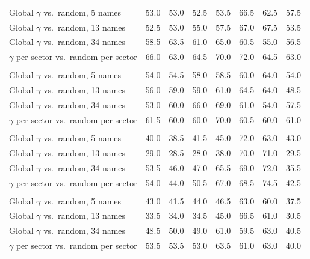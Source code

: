 \begin{table}[H]
\begin{tabular}{l*{7}{r}}
Global $\gamma$ vs.\ random, 5 names & 53.0 & 53.0 & 52.5 & 53.5 & 66.5 & 62.5 & 57.5 \\
Global $\gamma$ vs.\ random, 13 names & 52.5 & 53.0 & 55.0 & 57.5 & 67.0 & 67.5 & 53.5 \\
Global $\gamma$ vs.\ random, 34 names & 58.5 & 63.5 & 61.0 & 65.0 & 60.5 & 55.0 & 56.5 \\
$\gamma$ per sector vs.\ random per sector & 66.0 & 63.0 & 64.5 & 70.0 & 72.0 & 64.5 & 63.0 \\
\addlinespace
\multicolumn{8}{l}{\emph{Burst stress (200), hedge on}} \\
Global $\gamma$ vs.\ random, 5 names & 54.0 & 54.5 & 58.0 & 58.5 & 60.0 & 64.0 & 54.0 \\
Global $\gamma$ vs.\ random, 13 names & 56.0 & 59.0 & 59.0 & 61.0 & 64.5 & 64.0 & 48.5 \\
Global $\gamma$ vs.\ random, 34 names & 53.0 & 60.0 & 66.0 & 69.0 & 61.0 & 54.0 & 57.5 \\
$\gamma$ per sector vs.\ random per sector & 61.5 & 60.0 & 60.0 & 70.0 & 60.5 & 60.0 & 61.0 \\
\addlinespace
\multicolumn{8}{l}{\emph{Bear stress (200), hedge off}} \\
Global $\gamma$ vs.\ random, 5 names & 40.0 & 38.5 & 41.5 & 45.0 & 72.0 & 63.0 & 43.0 \\
Global $\gamma$ vs.\ random, 13 names & 29.0 & 28.5 & 28.0 & 38.0 & 70.0 & 71.0 & 29.5 \\
Global $\gamma$ vs.\ random, 34 names & 53.5 & 46.0 & 47.0 & 65.5 & 69.0 & 72.0 & 35.5 \\
$\gamma$ per sector vs.\ random per sector & 54.0 & 44.0 & 50.5 & 67.0 & 68.5 & 74.5 & 42.5 \\
\addlinespace
\multicolumn{8}{l}{\emph{Bear stress (200), hedge on}} \\
Global $\gamma$ vs.\ random, 5 names & 43.0 & 41.5 & 44.0 & 46.5 & 63.0 & 60.0 & 37.5 \\
Global $\gamma$ vs.\ random, 13 names & 33.5 & 34.0 & 34.5 & 45.0 & 66.5 & 61.0 & 30.5 \\
Global $\gamma$ vs.\ random, 34 names & 48.5 & 50.0 & 49.0 & 61.0 & 59.5 & 63.0 & 40.5 \\
$\gamma$ per sector vs.\ random per sector & 53.5 & 53.5 & 53.0 & 63.5 & 61.0 & 63.0 & 40.0 \\
\bottomrule
\end{tabular}
\end{table}
